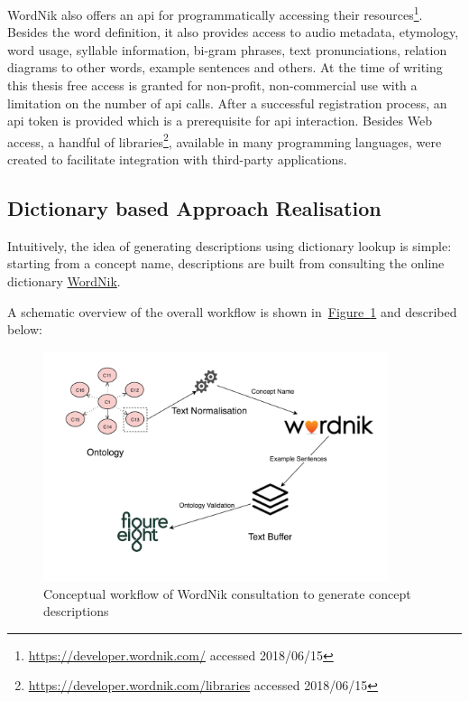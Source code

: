 WordNik also offers an \gls{api} for programmatically accessing their resources\footnote{\url{https://developer.wordnik.com/} accessed 2018/06/15}. Besides the word definition, it also provides access to audio metadata, etymology, word usage, syllable information, bi-gram phrases, text pronunciations, relation diagrams to other words, example sentences and others. At the time of writing this thesis free access is granted for non-profit, non-commercial use with a limitation on the number of \gls{api} calls. 
After a successful registration process, an \gls{api} token is provided which is a prerequisite for \gls{api} interaction. Besides Web access, a handful of libraries\footnote{\url{https://developer.wordnik.com/libraries} accessed 2018/06/15}, available in many programming languages, were created to facilitate integration with third-party applications. 

\subsection{Dictionary based Approach Realisation}\label{sec:enrichment_dictionary_approach}
Intuitively, the idea of generating descriptions using dictionary lookup is simple: starting from a concept name, descriptions are built from consulting the online dictionary \hyperref[sec:wordnik]{WordNik}. 

A schematic overview of the overall workflow is shown in~\hyperref[fig:external_source_workflow]{Figure~\ref*{fig:external_source_workflow}} and described below:
\begin{figure}
	 \centering
	 \includegraphics[width=0.9\textwidth]{drawio/External_Source_Workflow}
	 \caption{Conceptual workflow of WordNik consultation to generate concept descriptions}\label{fig:external_source_workflow}
\end{figure}

